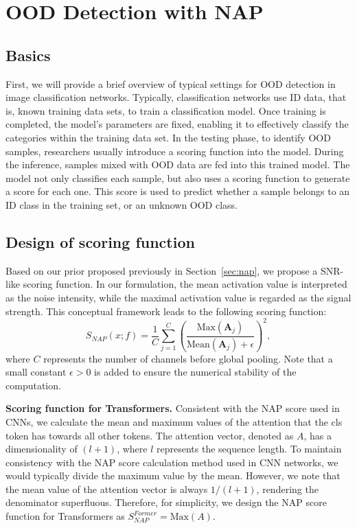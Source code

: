\section{OOD Detection with NAP}
\subsection{Basics}
First, we will provide a brief overview of typical settings for OOD detection in image classification networks. Typically, classification networks use ID data, that is, known training data sets, to train a classification model. Once training is completed, the model's parameters are fixed, enabling it to effectively classify the categories within the training data set.
In the testing phase, to identify OOD samples, researchers usually introduce a scoring function into the model. During the inference, samples mixed with OOD data are fed into this trained model. The model not only classifies each sample, but also uses a scoring function to generate a score for each one. This score is used to predict whether a sample belongs to an ID class in the training set, or an unknown OOD class.

\subsection{Design of scoring function}
\label{sec:scoring}
Based on our prior proposed previously in Section~\ref{sec:nap}, we propose a SNR-like scoring function. In our formulation, the mean activation value is interpreted as the noise intensity, while the maximal activation value is regarded as the signal strength. This conceptual framework leads to the following scoring function:
\begin{equation}
   S_{\textit{NAP}}(x;f)=\frac{1}{C}\sum_{j=1}^{C}\left(\frac{\text{Max}(\mathbf{A}_j)}{\text{Mean}(\mathbf{A}_j) + \epsilon}\right)^2 , 
\end{equation}
where \( C \) represents the number of channels before global pooling. Note that a small constant $\epsilon>0$ is added to ensure the numerical stability of the computation.


\noindent\textbf{Scoring function for Transformers.} 
Consistent with the NAP score used in CNNs, we calculate the mean and maximum values of the attention that the cls token has towards all other tokens. 
The attention vector, denoted as $A$, has a dimensionality of 
\((l+1)\), where \(l\) represents the sequence length.
To maintain consistency with the NAP score calculation method used in CNN networks, we would typically divide the maximum value by the mean. However, we note that the mean value of the attention vector is always \(1/(l+1)\), rendering the denominator superfluous. Therefore, for simplicity, we design the NAP score function for Transformers as 
$S_{NAP}^{Former} = \text{Max}(A)$.

